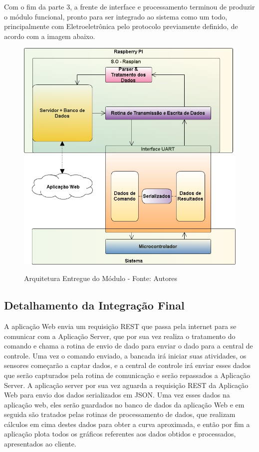 Com o fim da parte 3, a frente de interface e processamento terminou de produzir o módulo funcional, pronto para ser integrado ao sistema como um todo, principalmente com Eletroeletrônica pelo protocolo previamente definido, de acordo com a imagem abaixo.

\begin{figure}[H]
  \centering
  \includegraphics[keepaspectratio=true,scale=0.7]{figuras/nova_arquitetura.png}
  \label{fig:nova_arquitetura}
  \caption{Arquitetura Entregue do Módulo - Fonte: Autores}
\end{figure}


\subsection{Detalhamento da Integração Final}

A aplicação Web envia um requisição REST que passa pela internet para se comunicar com a Aplicação Server, que por sua vez realiza o tratamento do comando e chama a rotina de envio de dado para enviar o dado para a central de controle. Uma vez o comando enviado, a bancada irá iniciar suas atividades, os sensores começarão a captar dados, e a central de controle irá enviar esses dados que serão capturados pela rotina de comunicação e serão repassados a Aplicação Server. A aplicação server por sua vez aguarda a requisição REST da Aplicação Web para envio dos dados serializados em JSON. Uma vez esses dados na aplicação web, eles serão guardados no banco de dados da aplicação Web e em seguida são tratados pelas rotinas de processamento de dados, que realizam cálculos em cima destes dados para obter a curva aproximada, e então por fim a aplicação plota todos os gráficos referentes aos dados obtidos e processados, apresentados ao cliente.

